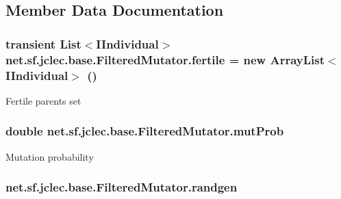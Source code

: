 \subsection{Member Data Documentation}
\hypertarget{classnet_1_1sf_1_1jclec_1_1base_1_1_filtered_mutator_aac6607c708d1937e2048a190da3d9b8b}{
\subsubsection[{fertile}]{\setlength{\rightskip}{0pt plus 5cm}transient List$<${\bf I\-Individual}$>$ net.\-sf.\-jclec.\-base.\-Filtered\-Mutator.\-fertile = new Array\-List$<${\bf I\-Individual}$>$ ()\hspace{0.3cm}{\ttfamily [protected]}}}\label{classnet_1_1sf_1_1jclec_1_1base_1_1_filtered_mutator_aac6607c708d1937e2048a190da3d9b8b}
Fertile parents set \hypertarget{classnet_1_1sf_1_1jclec_1_1base_1_1_filtered_mutator_ac5ca6f680430f923bc7e92a7de095721}{
\subsubsection[{mut\-Prob}]{\setlength{\rightskip}{0pt plus 5cm}double net.\-sf.\-jclec.\-base.\-Filtered\-Mutator.\-mut\-Prob\hspace{0.3cm}{\ttfamily [protected]}}}\label{classnet_1_1sf_1_1jclec_1_1base_1_1_filtered_mutator_ac5ca6f680430f923bc7e92a7de095721}
Mutation probability \hypertarget{classnet_1_1sf_1_1jclec_1_1base_1_1_filtered_mutator_a846465d238479e38f6a752eed781cc2b}{
\subsubsection[{randgen}]{ net.\-sf.\-jclec.\-base.\-Filtered\-Mutator.\-randgen\hspace{0.3cm}{\ttfamily [protected]}}}\label{classnet_1_1sf_1_1jclec_1_1base_1_1_filtered_mutator_a846465d238479e38f6a752eed781cc2b}

